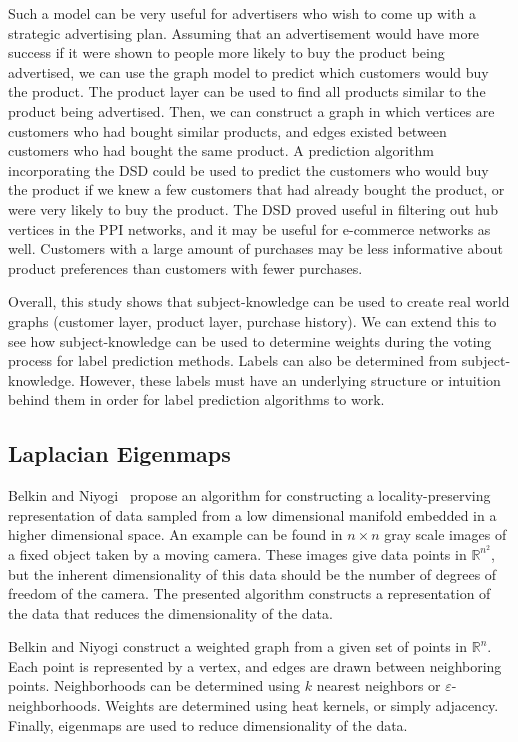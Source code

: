 Such a model can be very useful for advertisers who wish to come up with a
strategic advertising plan. Assuming that an advertisement would have more success if it were shown
to people more likely to buy the product being advertised, we can use the graph model to predict
which customers would buy the product. The product layer can be used to find all products similar to
the product being advertised. Then, we can construct a graph in which vertices are customers who had
bought similar products, and edges existed between customers who had bought the same product.
A prediction algorithm incorporating the DSD could be used to predict the customers who would buy the
product if we knew a few customers that had already bought the product, or were very likely to buy
the product. The DSD proved useful in filtering out hub vertices in the PPI networks, and it may be useful for e-commerce networks as well. Customers with a large amount of purchases may be less informative about product preferences than customers with fewer purchases.

Overall, this study shows that subject-knowledge can be used to create real
world graphs (customer layer, product layer, purchase history). We can extend
this to see how subject-knowledge can be used to determine weights during
the voting process for label prediction methods. Labels can also be 
determined from subject-knowledge. However, these labels must have an
underlying structure or intuition behind them in order for label prediction
algorithms to work.


\subsection{Laplacian Eigenmaps} Belkin and Niyogi~\cite{belkin2002laplacian} propose an algorithm
for constructing a locality-preserving representation of data sampled from a low dimensional
manifold embedded in a higher dimensional space. An example can be found in $n\times n$ gray scale
images of a fixed object taken by a moving camera. These images give data points in
$\mathbb{R}^{n^{2}}$, but the inherent dimensionality of this data should be the number of degrees
of freedom of the camera. The presented algorithm constructs a representation of the data that
reduces the dimensionality of the data.

Belkin and Niyogi construct a weighted graph from a given set of points
in $\mathbb{R}^{n}$. Each point is represented by a vertex, and edges are drawn between neighboring
points. Neighborhoods can be determined using $k$ nearest neighbors or $\varepsilon$-neighborhoods.
Weights are determined using heat kernels, or simply adjacency. Finally, eigenmaps are used to
reduce dimensionality of the data.

